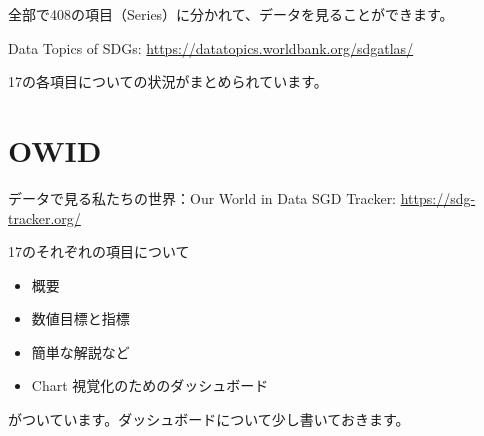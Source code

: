 \documentclass[
  xelatex, ja=standard]{bxjsbook}
\theoremstyle{definition}
\theoremstyle{definition}
\theoremstyle{definition}
\theoremstyle{definition}
\theoremstyle{remark}
\begin{document}
全部で408の項目（Series）に分かれて、データを見ることができます。

Data Topics of SDGs: \url{https://datatopics.worldbank.org/sdgatlas/}

17の各項目についての状況がまとめられています。

\hypertarget{owid}{%
\section{OWID}\label{owid}}

データで見る私たちの世界：Our World in Data SGD Tracker: \url{https://sdg-tracker.org/}

17のそれぞれの項目について

\begin{itemize}
\item
  概要
\item
  数値目標と指標
\item
  簡単な解説など
\item
  Chart 視覚化のためのダッシュボード
\end{itemize}

がついています。ダッシュボードについて少し書いておきます。
\end{document}
